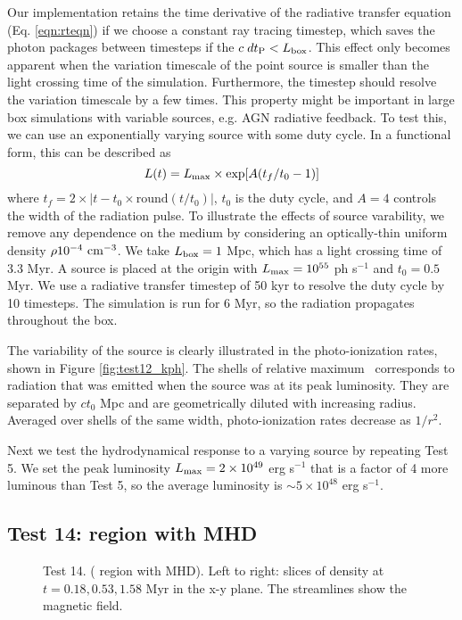 \documentclass[12pt,preprint]{aastex}
\begin{document}
Our implementation retains the time derivative of the radiative
transfer equation (Eq. \ref{eqn:rteqn}) if we choose a constant ray
tracing timestep, which saves the photon packages between timesteps if
the $c\;dt_{\rm P} < L_{\rm box}$.  This effect only becomes apparent
when the variation timescale of the point source is smaller than the
light crossing time of the simulation.  Furthermore, the timestep
should resolve the variation timescale by a few times.  This property
might be important in large box simulations with variable sources,
e.g. AGN radiative feedback.  To test this, we can use an
exponentially varying source with some duty cycle.  In a functional
form, this can be described as
%
\begin{equation}
  \label{eqn:test13}
  L(t) = L_{\rm max} \times \exp[A(t_f/t_0 - 1)]
\end{equation}
%
where $t_f = 2 \times |t - t_0 \times \mathrm{round}(t/t_0)|$, $t_0$
is the duty cycle, and $A=4$ controls the width of the radiation
pulse.  To illustrate the effects of source varability, we remove any
dependence on the medium by considering an optically-thin uniform
density $\rho 10^{-4}~\cubecm$.  We take $L_{\rm box} = 1$ Mpc, which
has a light crossing time of 3.3 Myr.  A source is placed at the
origin with $L_{\rm max} = 10^{55}$ ph s$^{-1}$ and $t_0 = 0.5$ Myr.
We use a radiative transfer timestep of 50 kyr to resolve the duty
cycle by 10 timesteps.  The simulation is run for 6 Myr, so the
radiation propagates throughout the box.

The variability of the source is clearly illustrated in the
photo-ionization rates, shown in Figure \ref{fig:test12_kph}.  The
shells of relative maximum \kph~corresponds to radiation that was
emitted when the source was at its peak luminosity.  They are
separated by $ct_0$ Mpc and are geometrically diluted with increasing
radius.  Averaged over shells of the same width, photo-ionization
rates decrease as $1/r^2$.

Next we test the hydrodynamical response to a varying source by
repeating Test 5.  We set the peak luminosity $L_{\rm max} = 2 \times
10^{49}$ erg s$^{-1}$ that is a factor of 4 more luminous than Test
5, so the average luminosity is $\sim 5 \times 10^{48}$ erg s$^{-1}$.

\subsection{Test 14:  region with MHD}

\begin{figure}[t]
  \caption{\label{fig:test14_1} Test 14. ( region with MHD).
    Left to right: slices of density at $t = 0.18, 0.53, 1.58$ Myr in
    the x-y plane.  The streamlines show the magnetic field.}
\end{figure}
\end{document}

